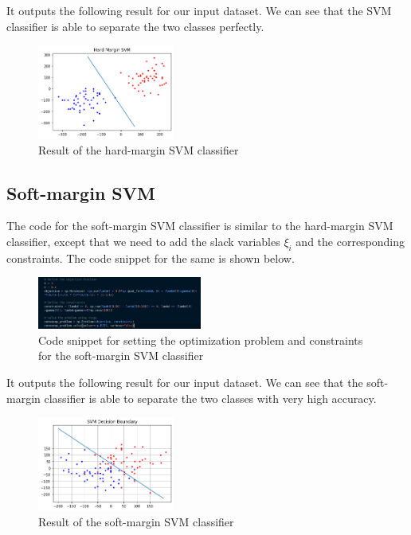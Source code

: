 \documentclass[journal]{IEEEtran}
\begin{document}
It outputs the following result for our input dataset. We can see that the SVM classifier is able to separate the two classes perfectly.
\begin{figure}[!ht]
    \centering
    \includegraphics[width=0.4\textwidth]{hard-margin.png}
    \caption{Result of the hard-margin SVM classifier}
    \label{fig:res1}
\end{figure}


\subsection*{Soft-margin SVM}
The code for the soft-margin SVM classifier is similar to the hard-margin SVM classifier, except that we need to add the slack variables $\xi_i$ and the corresponding constraints. The code snippet for the same is shown below.
\begin{figure}[H]
    \centering
    \includegraphics[width=0.48\textwidth]{code-snippet-soft.png}
    \caption{Code snippet for setting the optimization problem and constraints for the soft-margin SVM classifier}
    \label{fig:code2}
\end{figure}

\enlargethispage{-\baselineskip}
It outputs the following result for our input dataset. We can see that the soft-margin classifier is able to separate the two classes with very high accuracy. \vspace*{2cm}
\begin{figure}[!ht]
    \centering
    \includegraphics[width=0.4\textwidth]{soft-margin.png}
    \caption{Result of the soft-margin SVM classifier}
    \label{fig:res2}
\end{figure}
\end{document}
